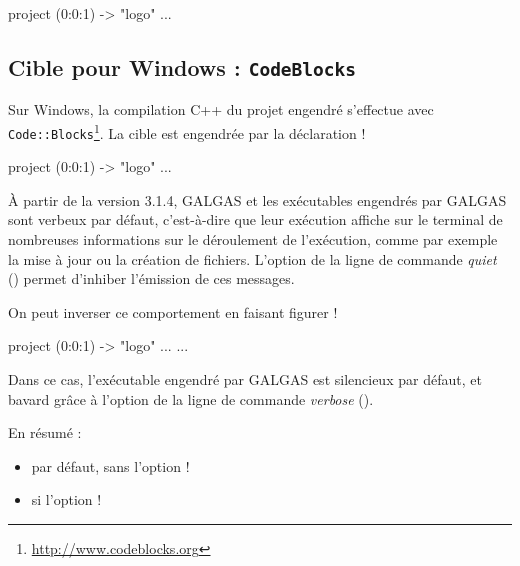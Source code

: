 \begin{galgas}
project (0:0:1) -> "logo" {
  ...
}
\end{galgas}



\subsection{Cible pour Windows : \texttt{CodeBlocks}}

Sur Windows, la compilation C++ du projet engendré s'effectue avec \texttt{Code{}::Blocks}\footnote{\url{http://www.codeblocks.org}}. La cible est engendrée par la déclaration \ggs!%

\begin{galgas}
project (0:0:1) -> "logo" {
  ...
}
\end{galgas}






À partir de la version 3.1.4, GALGAS et les exécutables engendrés par GALGAS sont verbeux par défaut, c'est-à-dire que leur exécution affiche sur le terminal de nombreuses informations sur le déroulement de l'exécution, comme par exemple la mise à jour ou la création de fichiers. L'option de la ligne de commande \emph{quiet} () permet d'inhiber l'émission de ces messages.

On peut inverser ce comportement en faisant figurer \ggs!%
\begin{galgas}
project (0:0:1) -> "logo" {
  ...
  ...
}
\end{galgas}

 Dans ce cas, l'exécutable engendré par GALGAS est silencieux par défaut, et bavard grâce à l'option de la ligne de commande \emph{verbose} ().

En résumé :
\begin{itemize}
\item par défaut, sans l'option \ggs!%
\item si l'option \ggs!%
\end{itemize}


